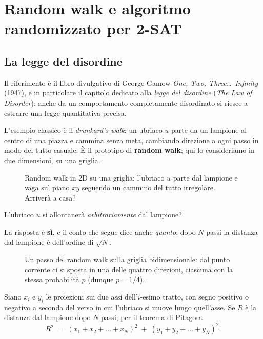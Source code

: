 \chapter{Random walk e algoritmo randomizzato per 2-SAT}

\section{La legge del disordine}

Il riferimento è il libro divulgativo di George Gamow \emph{One, Two, Three\dots\ Infinity}
(1947), e in particolare il capitolo dedicato alla \emph{legge del disordine} (\emph{The Law
of Disorder}): anche da un comportamento completamente disordinato si riesce a estrarre una
legge quantitativa precisa.

L'esempio classico è il \emph{drunkard's walk}: un ubriaco $u$ parte da un lampione al centro
di una piazza e cammina senza meta, cambiando direzione a ogni passo in modo del tutto
casuale. È il prototipo di \textbf{random walk}; qui lo consideriamo in due dimensioni, su una
griglia.

\begin{figure}[H]
  \centering
  
  \caption{Random walk in $2$D su una griglia: l'ubriaco $u$ parte dal lampione e vaga sul
  piano $xy$ seguendo un cammino del tutto irregolare. Arriverà a casa?}
\end{figure}

\begin{domanda}
L'ubriaco $u$ si allontanerà \emph{arbitrariamente} dal lampione?
\end{domanda}

La risposta è \textbf{sì}, e il conto che segue dice anche \emph{quanto}: dopo $N$ passi la
distanza dal lampione è dell'ordine di $\sqrt{N}$.

\begin{figure}[H]
  \centering
  
  \caption{Un passo del random walk sulla griglia bidimensionale: dal punto corrente ci si
  sposta in una delle quattro direzioni, ciascuna con la stessa probabilità $p$ (dunque
  $p = 1/4$).}
\end{figure}

Siano $x_i$ e $y_i$ le proiezioni sui due assi dell'$i$-esimo tratto, con segno positivo o
negativo a seconda del verso in cui l'ubriaco si muove lungo quell'asse. Se $R$ è la distanza
dal lampione dopo $N$ passi, per il teorema di Pitagora
\[
  R^{2} \;=\; (x_1 + x_2 + \dots + x_N)^{2} \;+\; (y_1 + y_2 + \dots + y_N)^{2}.
\]


